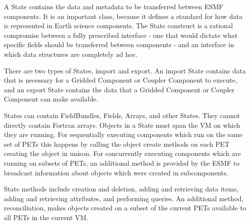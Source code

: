 %


A State contains the data and metadata to be transferred between 
ESMF components.  It is an important class, because it defines a 
standard for how data is represented in Earth science components.  The 
State construct is a rational compromise between a fully prescribed 
interface - one that would dictate what specific fields should be 
transferred between components - and an interface in which data structures
are completely ad hoc.

There are two types of States, import and export.
An import State contains data that is necessary for a Gridded Component
or Coupler Component to execute, and an export State contains the data
that a Gridded Component or Coupler Component can make available.

States can contain FieldBundles, Fields, Arrays, and other States.  They
cannot directly contain Fortran arrays.   Objects in a State must span
the VM on which they are running.  For sequentially executing components
which run on the same set of PETs this happens by calling the object
create methods on each PET creating the object in unison.   For
concurrently executing components which are running on subsets of PETs,
an additional method is provided by the ESMF to broadcast information
about objects which were created in subcomponents.

State methods include creation and deletion, adding and retrieving 
data items, adding and retrieving attributes, and performing queries.  
An additional method, reconciliation, makes objects created on a subset
of the current PETs available to all PETs in the current VM.

